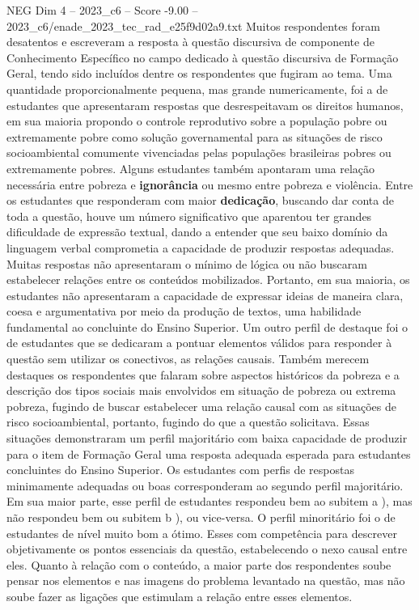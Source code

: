 \begin{textsample}{NEG Dim 4 – 2023\_c6 – Score -9.00 – 2023\_c6/enade\_2023\_tec\_rad\_e25f9d02a9.txt}
Muitos respondentes foram desatentos e escreveram a resposta à questão discursiva de componente de Conhecimento Específico no campo dedicado à questão discursiva de Formação Geral, tendo sido incluídos dentre os respondentes que fugiram ao tema.
Uma quantidade proporcionalmente pequena, mas grande numericamente, foi a de estudantes que apresentaram respostas que desrespeitavam os direitos humanos, em sua maioria propondo o controle reprodutivo sobre a população pobre ou extremamente pobre como solução governamental para as situações de risco socioambiental comumente vivenciadas pelas populações brasileiras pobres ou extremamente pobres.
Alguns estudantes também apontaram uma relação necessária entre pobreza e \textbf{ignorância} ou mesmo entre pobreza e violência.
Entre os estudantes que responderam com maior \textbf{dedicação}, buscando dar conta de toda a questão, houve um número significativo que aparentou ter grandes dificuldade de expressão textual, dando a entender que seu baixo domínio da linguagem verbal comprometia a capacidade de produzir respostas adequadas.
Muitas respostas não apresentaram o mínimo de lógica ou não buscaram estabelecer relações entre os conteúdos mobilizados.
Portanto, em sua maioria, os estudantes não apresentaram a capacidade de expressar ideias de maneira clara, coesa e argumentativa por meio da produção de textos, uma habilidade fundamental ao concluinte do Ensino Superior.
Um outro perfil de destaque foi o de estudantes que se dedicaram a pontuar elementos válidos para responder à questão sem utilizar os conectivos, as relações causais.
Também merecem destaques os respondentes que falaram sobre aspectos históricos da pobreza e a descrição dos tipos sociais mais envolvidos em situação de pobreza ou extrema pobreza, fugindo de buscar estabelecer uma relação causal com as situações de risco socioambiental, portanto, fugindo do que a questão solicitava.
Essas situações demonstraram um perfil majoritário com baixa capacidade de produzir para o item de Formação Geral uma resposta adequada esperada para estudantes concluintes do Ensino Superior.
Os estudantes com perfis de respostas minimamente adequadas ou boas corresponderam ao segundo perfil majoritário.
Em sua maior parte, esse perfil de estudantes respondeu bem ao subitem a ), mas não respondeu bem ou subitem b ), ou vice-versa.
O perfil minoritário foi o de estudantes de nível muito bom a ótimo.
Esses com competência para descrever objetivamente os pontos essenciais da questão, estabelecendo o nexo causal entre eles.
Quanto à relação com o conteúdo, a maior parte dos respondentes soube pensar nos elementos e nas imagens do problema levantado na questão, mas não soube fazer as ligações que estimulam a relação entre esses elementos.

\end{textsample}
